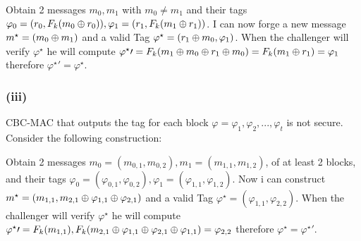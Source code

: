 \documentclass[11pt]{article}
\newcounter{t0d0_counter}
\begin{document}
Obtain 2 messages $m_0, m_1$ with $m_0\neq m_1$ and their tags $\varphi_0=(r_0,F_k(m_0\oplus r_0)), \varphi_1=(r_1,F_k(m_1\oplus r_1))$.
I can now forge a new message $m^\star=(m_0\oplus m_1)$ and a valid Tag $\varphi^\star=(r_1\oplus m_0, \varphi_1)$.
When the challenger will verify $\varphi^\star$ he will compute
$\varphi^\star\prime=F_k(m_1\oplus m_0\oplus r_1\oplus m_0)=F_k(m_1\oplus r_1)=\varphi_1$
therefore $\varphi^\star\prime=\varphi^\star$.

\subsubsection{(iii)}
CBC-MAC that outputs the tag for each block $\varphi=\varphi_1,\varphi_2,...,\varphi_t$ is not secure. Consider the following construction:

Obtain 2 messages $m_0=(m_{0,1},m_{0,2}), m_1=(m_{1,1},m_{1,2})$, of at least 2 blocks, and their tags 
$\varphi_0=(\varphi_{0,1},\varphi_{0,2}), \varphi_1=(\varphi_{1,1},\varphi_{1,2})$. Now i can construct 
$m^\star=(m_{1,1}, m_{2,1}\oplus\varphi_{1,1}\oplus\varphi_{2,1})$ and a valid Tag 
$\varphi^\star=(\varphi_{1,1}, \varphi_{2,2})$. When the challenger will verify $\varphi^\star$ he will compute
$\varphi^\star\prime=F_k(m_{1,1}),F_k(m_{2,1}\oplus\varphi_{1,1}\oplus\varphi_{2,1}\oplus\varphi_{1,1})=\varphi_{2,2}$
therefore $\varphi^\star=\varphi^\star\prime$.
\end{document}
